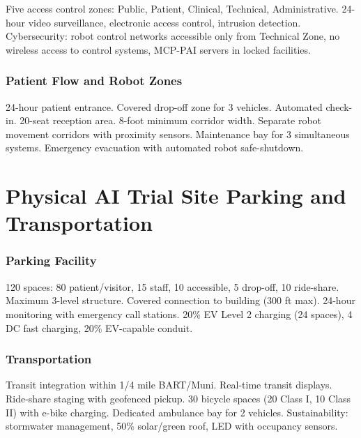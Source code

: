 \documentclass[11pt,letterpaper]{article}
\begin{document}
Five access control zones: Public, Patient, Clinical, Technical, Administrative.
24-hour video surveillance, electronic access control, intrusion detection.
Cybersecurity: robot control networks accessible only from Technical Zone, no
wireless access to control systems, MCP-PAI servers in locked facilities.

\section{Patient Flow and Robot Zones}

24-hour patient entrance. Covered drop-off zone for 3 vehicles. Automated
check-in. 20-seat reception area. 8-foot minimum corridor width. Separate
robot movement corridors with proximity sensors. Maintenance bay for 3
simultaneous systems. Emergency evacuation with automated robot safe-shutdown.

\newpage


\part{Physical AI Trial Site Parking and Transportation}

\section{Parking Facility}

120 spaces: 80 patient/visitor, 15 staff, 10 accessible, 5 drop-off, 10
ride-share. Maximum 3-level structure. Covered connection to building (300 ft
max). 24-hour monitoring with emergency call stations. 20\% EV Level 2 charging
(24 spaces), 4 DC fast charging, 20\% EV-capable conduit.

\section{Transportation}

Transit integration within 1/4 mile BART/Muni. Real-time transit displays.
Ride-share staging with geofenced pickup. 30 bicycle spaces (20 Class I, 10
Class II) with e-bike charging. Dedicated ambulance bay for 2 vehicles.
Sustainability: stormwater management, 50\% solar/green roof, LED with
occupancy sensors.
\end{document}
